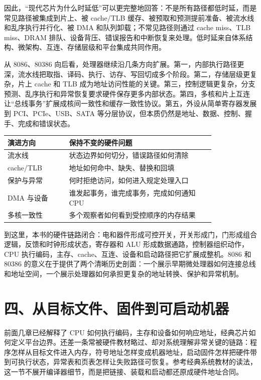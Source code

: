因此，“现代芯片为什么时延低”可以更完整地回答：不是所有路径都低时延，而是常见路径被集成到片上、被 cache/TLB 缓存、被预取和预测提前准备、被流水线和乱序执行并行化、被 DMA 和队列卸载；不常见路径则通过 cache miss、TLB miss、DRAM 排队、设备背压、错误报告和中断恢复来处理。低时延来自体系结构、微架构、互连、存储层级和平台集成共同作用。

从 8086、80386 向后看，处理器继续沿几条方向扩展。第一，内部执行路径更深，流水线把取指、译码、执行、访存、写回切成多个阶段。第二，存储层级更复杂，片上 cache 和 TLB 成为地址访问性能的关键。第三，控制逻辑更复杂，分支预测、乱序执行和异常恢复要求硬件保存更多内部状态。第四，多核和片上互连让“总线事务”扩展成核间一致性和缓存一致性协议。第五，外设从简单寄存器发展到 PCI、PCIe、USB、SATA 等分层协议，但本质仍然是地址、数据、控制、握手、完成和错误状态。

\begin{longtable}{L{0.24\linewidth}L{0.58\linewidth}}
\toprule
演进方向 & 保持不变的硬件问题 \\
\midrule
流水线 & 状态边界如何切分，错误路径如何清除 \\
cache/TLB & 地址如何命中、缺失、替换和回填 \\
保护与异常 & 何时拒绝访问，如何进入规定处理入口 \\
DMA 与设备 & 谁发起事务，谁完成事务，完成如何通知 CPU \\
多核一致性 & 多个观察者如何看到受控顺序的内存结果 \\
\bottomrule
\end{longtable}

到这里，本书的硬件链路闭合：电和器件形成可控开关，开关形成门，门形成组合逻辑，反馈和时钟形成状态，寄存器和 ALU 形成数据通路，控制器组织动作，CPU 执行编码，主存、cache、互连、设备和启动路径把它扩展成整机。8086 和 80386 的意义在于提供了两个清晰历史剖面：一个展示早期微处理器如何连接总线和地址空间，一个展示处理器如何承担更复杂的地址转换、保护和异常机制。

\section{四、从目标文件、固件到可启动机器}

前面几章已经解释了 CPU 如何执行编码，主存和设备如何响应地址，经典芯片如何定义平台边界。还差一条常被硬件教材略过、却对系统理解非常关键的链路：程序怎样从目标文件进入内存，符号地址怎样变成机器地址，启动固件怎样把硬件带到可执行状态，异常表和页表怎样让失败路径可恢复。参考经典系统教材的读法，这一节不展开编译器细节，而是把链接、装载和启动都还原成硬件地址合同。

